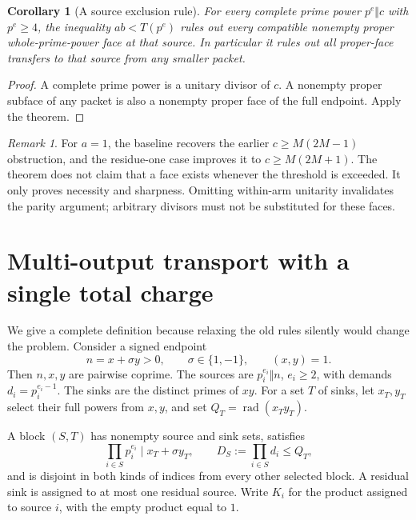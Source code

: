 \documentclass[11pt]{article}
\newtheorem{corollary}[theorem]{Corollary}
\theoremstyle{definition}\newtheorem{definition}[theorem]{Definition}
\theoremstyle{remark}\newtheorem{remark}[theorem]{Remark}
\newcommand{\rad}{\operatorname{rad}}
\begin{document}
\begin{corollary}[A source exclusion rule]\label{cor:exclude}
For every complete prime power \(p^e\Vert c\) with \(p^e\ge4\), the inequality \(ab<T(p^e)\) rules out every compatible nonempty proper whole-prime-power face at that source. In particular it rules out all proper-face transfers to that source from any smaller packet.
\end{corollary}
\begin{proof}
A complete prime power is a unitary divisor of \(c\). A nonempty proper subface of any packet is also a nonempty proper face of the full endpoint. Apply the theorem.
\end{proof}
\begin{remark}
For \(a=1\), the baseline recovers the earlier \(c\ge M(2M-1)\) obstruction, and the residue-one case improves it to \(c\ge M(2M+1)\). The theorem does not claim that a face exists whenever the threshold is exceeded. It only proves necessity and sharpness. Omitting within-arm unitarity invalidates the parity argument; arbitrary divisors must not be substituted for these faces.
\end{remark}

\section{Multi-output transport with a single total charge}\label{sec:multi}
We give a complete definition because relaxing the old rules silently would change the problem. Consider a signed endpoint
\[
 n=x+\sigma y>0,\qquad \sigma\in\{1,-1\},\qquad (x,y)=1.
\]
Then \(n,x,y\) are pairwise coprime. The sources are \(p_i^{e_i}\Vert n\), \(e_i\ge2\), with demands \(d_i=p_i^{e_i-1}\). The sinks are the distinct primes of \(xy\). For a set \(T\) of sinks, let \(x_T,y_T\) select their full powers from \(x,y\), and set \(Q_T=\rad(x_Ty_T)\).

A block \((S,T)\) has nonempty source and sink sets, satisfies
\[
 \prod_{i\in S}p_i^{e_i}\mid x_T+\sigma y_T,\qquad
 D_S:=\prod_{i\in S}d_i\le Q_T,
\]
and is disjoint in both kinds of indices from every other selected block. A residual sink is assigned to at most one residual source. Write \(K_i\) for the product assigned to source \(i\), with the empty product equal to \(1\).
\end{document}
